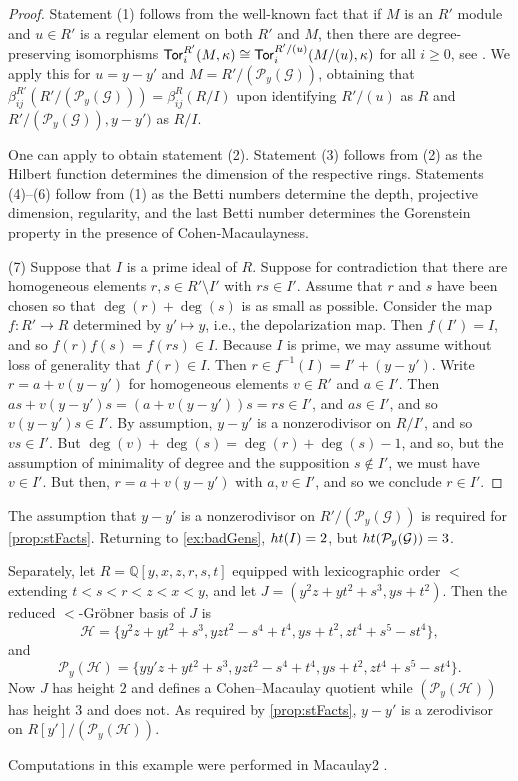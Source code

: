 \documentclass[12pt, reqno]{amsart}
\numberwithin{equation}{section}
\newtheorem{Main Conjecture}[theorem]{Main Conjecture}
\theoremstyle{definition}
\newenvironment{example}
  {\pushQED{\qed}\renewcommand{\qedsymbol}{$\diamondsuit$}\examplex}
  {\popQED\endexamplex}
\theoremstyle{plain}
\newcommand{\hgt}{{\rm{ht }}}
\newcommand{\QQ}{\mathbb{Q}}
\newcommand{\G}{\mathcal{G}}
\renewcommand{\H}{\mathcal{H}}
\renewcommand{\P}{\mathcal{P}}
\newcommand{\Tor}{{\sf Tor}}
\begin{document}
\begin{proof}


    Statement (1) follows from the well-known fact that if $M$ is an $R'$ module and $u\in R'$ is a regular element on both $R'$ and $M$, then there are degree-preserving isomorphisms $\Tor^{R'}_i(M,\kappa)\cong \Tor^{R'/(u)}_i(M/(u),\kappa)$ for all $i\geq 0$, see  \cite[Corollary 20.4]{Peeva}. We apply this for $u=y-y'$ and $M=R'/(\P_y(\G))$, obtaining that $ \beta^{R'}_{ij} (R'/(\P_y(\G)))=\beta^R_{ij}(R/I)$ upon identifying  $R'/(u)$ as $R$ and $R'/(\P_y(\G)), y-y')$ as $R/I$.

    One can apply \cite[Theorem 20.2]{Peeva} to obtain statement (2). Statement (3) follows from (2) as the Hilbert function determines the dimension of the respective rings. 
    Statements (4)--(6) follow from (1) as the Betti numbers determine the depth, projective dimension, regularity, and the last Betti number determines the Gorenstein property in the presence of Cohen-Macaulayness.

   (7)  Suppose that $I$ is a prime ideal of $R$.  Suppose for contradiction that there are homogeneous elements $r, s \in R' \setminus I'$ with $rs \in I'$.  Assume that $r$ and $s$ have been chosen so that $\deg(r)+\deg(s)$ is as small as possible. 
 Consider the map $f:R' \rightarrow R$ determined by $y' \mapsto y$, i.e., the depolarization map.  Then $f(I') = I$, and so $f(r)f(s) = f(rs) \in I$.  Because $I$ is prime, we may assume without loss of generality that $f(r) \in I$.  Then $r \in f^{-1}(I)= I'+(y-y')$.  Write $r = a+v(y-y')$ for homogeneous elements $v \in R'$ and $a \in I'$.  Then $as+v(y-y')s = (a+v(y-y'))s = rs \in I'$, and $as \in I'$, and so $v(y-y')s \in I'$.  By assumption, $y-y'$ is a nonzerodivisor on $R/I'$, and so $vs \in I'$.   But $\deg(v)+\deg(s) = \deg(r)+\deg(s)-1$, and so, but the assumption of minimality of degree and the supposition $s \notin I'$, we must have $v \in I'$.  But then, $r = a+v(y-y')$ with $a, v \in I'$, and so we conclude $r \in I'$.
\end{proof}
  
\begin{example}
The assumption that $y-y'$ is a nonzerodivisor on $R'/(\P_y(\G))$ is required for \cref{prop:stFacts}. Returning to \cref{ex:badGens}, $\hgt(I) = 2$, but $\hgt(\P_y(\G)) = 3$.

Separately, let $R = \QQ[y,x,z,r,s,t]$ equipped with lexicographic order $<$ extending $t<s<r<z<x<y$, and let $J = (y^2z+yt^2+s^3,ys+t^2)$.  Then the reduced $<$-Gr\"obner basis of $J$ is \[
\H = \{y^2z+yt^2+s^3, yzt^2-s^4+t^4,ys+t^2, zt^4+s^5-st^4\},
\] and \[
\P_y(\H) = \{yy'z+yt^2+s^3, yzt^2-s^4+t^4,ys+t^2, zt^4+s^5-st^4\}.
\] Now $J$ has height $2$ and defines a Cohen--Macaulay quotient while $(\P_y(\H))$ has height $3$ and does not. As required by \cref{prop:stFacts}, $y-y'$ is a zerodivisor on $R[y']/(\P_y(\H))$.

Computations in this example were performed in Macaulay2 \cite{M2}.
\end{example}
\end{document}
